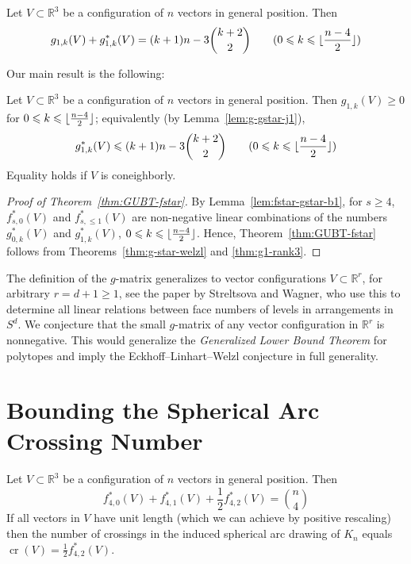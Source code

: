 \documentclass[a4paper,USenglish,cleveref, autoref, thm-restate,nolineno]{socg-lipics-v2021}
\DeclareMathOperator{\cross}{cr}
\renewcommand{\leq}{\leqslant}
\renewcommand{\geq}{\geqslant}
\newcommand{\R}{\mathbb{R}}
\DeclarePairedDelimiter\floor{\lfloor}{\rfloor}
\begin{document}
\begin{lemma}
\label{lem:g-gstar-j1}
Let $V \subset \R^3$ be a configuration of $n$ vectors in general position. Then
\[g_{1,k}(V)+ g^*_{1,k}(V)=(k+1)n-3\binom{k+2}{2} \qquad (0\leq k\leq \floor{\frac{n-4}{2}})\]
\end{lemma}
Our main result is the following:
\begin{theorem} 
\label{thm:g1-rank3}
Let $V \subset \R^3$ be a configuration of $n$ vectors in general position. Then $g_{1,k}(V) \geq 0$ for $0\leq k\leq \floor{\frac{n-4}{2}}$; equivalently (by Lemma~\ref{lem:g-gstar-j1}),
\[g^*_{1,k}(V) \leq (k+1)n-3\binom{k+2}{2} \qquad (0\leq k\leq \floor{\frac{n-4}{2}} )\]
Equality holds if $V$ is coneighborly.
\end{theorem}
\begin{proof}[Proof of Theorem~\ref{thm:GUBT-fstar}]
By Lemma~\ref{lem:fstar-gstar-b1}, for $s\geq 4$, $f_{s,0}^*(V)$ and $f_{s,\leq 1}^*(V)$ are non-negative linear combinations of the numbers $g^*_{0,k}(V)$ and $g^*_{1,k}(V)$, $0\leq k \leq \floor{\frac{n-4}{2}}$. Hence, Theorem~\ref{thm:GUBT-fstar} follows from Theorems~\ref{thm:g-star-welzl} and \ref{thm:g1-rank3}. 
\end{proof}
\begin{remark} The definition of the $g$-matrix generalizes to vector configurations $V\subset \R^r$, for arbitrary $r=d+1 \geq 1$, see the paper \cite{SW:DS} by Streltsova and Wagner, who use this to determine all linear relations between face numbers of levels in arrangements in $S^d$. We conjecture that the small $g$-matrix of any vector configuration in $\R^r$ is nonnegative. This would generalize the \emph{Generalized Lower Bound Theorem} for polytopes and imply the Eckhoff--Linhart--Welzl conjecture in full generality.
\end{remark}

\section{Bounding the Spherical Arc Crossing Number}
\label{sec:proof-crossing}
\begin{observation}
\label{obs:crossings-lin-dep}
Let $V \subset \R^3$ be a configuration of $n$ vectors in general position. Then
\[
f^*_{4,0}(V) + f^*_{4,1}(V) + \frac{1}{2} f^*_{4,2}(V) = \binom{n}{4}
\]
If all vectors in $V$ have unit length (which we can achieve by positive rescaling) then the number of crossings in the induced spherical arc drawing of $K_n$ equals
$\cross(V)= \frac{1}{2}f^*_{4,2}(V)$.
\end{observation}
\end{document}
